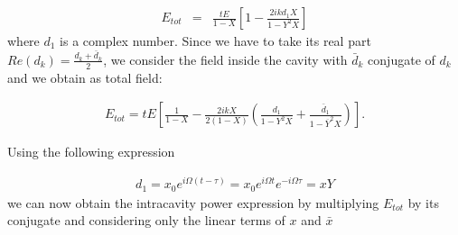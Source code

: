\begin{align}
E_{tot}&=&\frac{tE}{1-X}\left [1-\frac{2ikd_1 X}{1-Y^2X}\right ]
\end{align}
where $d_1$ is a complex number. Since we have to take its real part $Re (d_k)=\frac{d_k+\bar{d}_k}{2}$,
we consider the field inside the cavity with $\bar{d}_k$ conjugate of $d_k$ and we obtain as total field:%



\begin{align*}
E_{tot}=tE\left [\frac{1}{1-X}- \frac{2ikX}{2(1-X)}   \left ( \frac{d_1}{1-Y^2 X} +\frac{\bar{d}_1}{1-\overline{Y}^2 X}\right )\right].
\end{align*}

%
 
Using the following expression
 
\begin{align}
d_1=x_0e^{i\Omega(t-\tau)}=x_0e^{i\Omega t}e^{-i\Omega\tau}=xY  
\end{align}
we can now obtain the intracavity power expression by multiplying $E_{tot}$ by its conjugate
and considering only the linear terms of $x$ and $\bar{x}$

